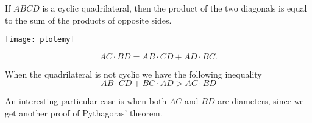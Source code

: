 \documentclass[12pt]{article}
\begin{document}
If $ABCD$ is a cyclic quadrilateral, then the product of the two diagonals is equal to the sum of the products of opposite sides.
\begin{center}
\texttt{[image: ptolemy]}
\end{center}

\[AC\cdot BD = AB\cdot CD + AD \cdot BC.\]

When the quadrilateral is not cyclic we have the following inequality
\[AB\cdot CD+BC\cdot AD>AC\cdot BD\]

An interesting particular case is when both $AC$ and $BD$ are diameters, since we get another proof of Pythagoras' theorem.
\end{document}
